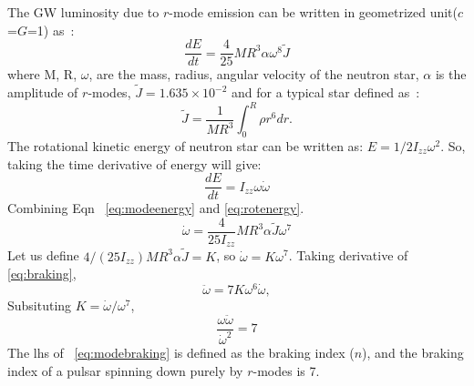 \documentclass{ttuthes2007}
\begin{document}
The \ac{GW} luminosity due to $r$-mode emission can be written in geometrized
unit($c$=$G$=1) as~\cite{Owen:2010ng}:
\begin{equation}\label{eq:modeenergy}
\frac{dE}{dt}=\frac{4}{25}M R^3 \alpha \omega^8\tilde{J}
\end{equation}
where M, R, $\omega$, are the mass, radius, angular velocity of the neutron
star, $\alpha$ is the amplitude of $r$-modes, $\tilde{J}=1.635\times10^{-2}$ and
for a typical star defined as~\cite{Owen:1998xg}:
\begin{equation}
\tilde{J}=\frac{1}{MR^3}\int_0^R\rho r^6dr.
\end{equation}
The rotational kinetic energy of neutron star can be written as:
$E=1/2I_{zz}\omega^2$. So, taking the time derivative of energy will give:
\begin{equation}\label{eq:rotenergy}
\frac{dE}{dt}= I_{zz}\omega\dot{\omega}
\end{equation}
Combining Eqn ~\ref{eq:modeenergy} and \ref{eq:rotenergy}.
\begin{equation}\label{eq:braking}
\dot{\omega}=\frac{4}{25 I_{zz}}M R^3 \alpha\tilde{J} \omega^7 
\end{equation}
Let us define $4/(25 I_{zz})M R^3 \alpha\tilde{J}=K$, so $\dot{\omega}=K
\omega^7$. 
Taking derivative of \ref{eq:braking},
\begin{equation}
\ddot{\omega}= 7K\omega^6\dot{\omega},
\end{equation}
Subsituting $K=\dot{\omega}/\omega^7$,
\begin{equation}\label{eq:modebraking}
\frac{\omega\ddot{\omega}}{\dot{\omega}^2}=7
\end{equation}
The lhs of  ~\ref{eq:modebraking} is defined as the braking index ($n$), and the
braking index of a pulsar spinning down purely by $r$-modes is 7. 
\end{document}
